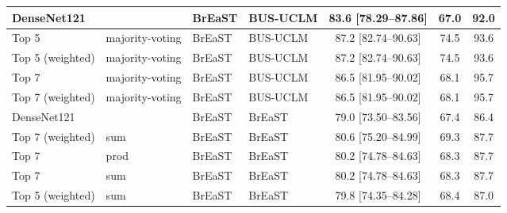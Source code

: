 \begin{tabular}{llllccc}
\midrule
\midrule
DenseNet121 & & BrEaST & BUS-UCLM & 83.6 [78.29--87.86] & 67.0 & 92.0\\ 
\midrule
Top 5 & majority-voting & BrEaST & BUS-UCLM & 87.2 [82.74--90.63] & 74.5 & 93.6\\ 
Top 5 (weighted) & majority-voting & BrEaST & BUS-UCLM & 87.2 [82.74--90.63] & 74.5 & 93.6\\ 
Top 7 & majority-voting & BrEaST & BUS-UCLM & 86.5 [81.95--90.02] & 68.1 & 95.7\\ 
Top 7 (weighted) & majority-voting & BrEaST & BUS-UCLM & 86.5 [81.95--90.02] & 68.1 & 95.7\\ 
\midrule
\midrule
DenseNet121 & & BrEaST & BrEaST & 79.0 [73.50--83.56] & 67.4 & 86.4\\ 
\midrule
Top 7 (weighted) & sum & BrEaST & BrEaST & 80.6 [75.20--84.99] & 69.3 & 87.7\\ 
Top 7 & prod & BrEaST & BrEaST & 80.2 [74.78--84.63] & 68.3 & 87.7\\ 
Top 7 & sum & BrEaST & BrEaST & 80.2 [74.78--84.63] & 68.3 & 87.7\\ 
Top 5 (weighted) & sum & BrEaST & BrEaST & 79.8 [74.35--84.28] & 68.4 & 87.0\\ 
\midrule
\midrule
\bottomrule
\end{tabular}
